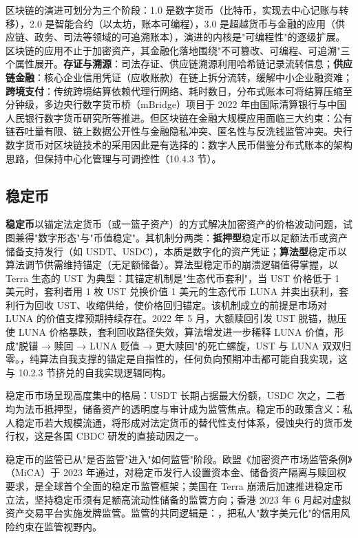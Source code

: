 区块链的演进可划分为三个阶段：1.0 是数字货币（比特币，实现去中心记账与转移），2.0 是智能合约（以太坊，账本可编程），3.0 是超越货币与金融的应用（供应链、政务、司法等领域的可追溯账本），演进的内核是"可编程性"的逐级扩展。区块链的应用不止于加密资产，其金融化落地围绕"不可篡改、可编程、可追溯"三个属性展开。\textbf{存证与溯源}：司法存证、供应链溯源利用哈希链记录流转信息；\textbf{供应链金融}：核心企业信用凭证（应收账款）在链上拆分流转，缓解中小企业融资难；\textbf{跨境支付}：传统跨境结算依赖代理行网络、耗时数日，分布式账本可将结算压缩至分钟级，多边央行数字货币桥（mBridge）项目于 2022 年由国际清算银行与中国人民银行数字货币研究所等推进。但区块链在金融大规模应用面临三大约束：公有链吞吐量有限、链上数据公开性与金融隐私冲突、匿名性与反洗钱监管冲突。央行数字货币对区块链技术的采用因此是有选择的：数字人民币借鉴分布式账本的架构思路，但保持中心化管理与可调控性（10.4.3 节）。

\subsection{稳定币}

\textbf{稳定币}以锚定法定货币（或一篮子资产）的方式解决加密资产的价格波动问题，试图兼得"数字形态"与"币值稳定"。其机制分两类：\textbf{抵押型}稳定币以足额法币或资产储备支持发行（如 USDT、USDC），本质是数字化的资产凭证；\textbf{算法型}稳定币以算法调节供需维持锚定（无足额储备）。算法型稳定币的崩溃逻辑值得掌握，以 Terra 生态的 UST 为典型：其锚定机制是"生态代币套利"，当 UST 价格低于 1 美元时，套利者用 1 枚 UST 兑换价值 1 美元的生态代币 LUNA 并卖出获利，套利行为回收 UST、收缩供给，使价格回归锚定。该机制成立的前提是市场对 LUNA 的价值支撑预期持续存在。2022 年 5 月，大额赎回引发 UST 脱锚，抛压使 LUNA 价格暴跌，套利回收路径失效，算法增发进一步稀释 LUNA 价值，形成"脱锚 → 赎回 → LUNA 贬值 → 更大赎回"的死亡螺旋，UST 与 LUNA 双双归零。，纯算法自我支撑的锚定是自指性的，任何负向预期冲击都可能自我实现，这与 10.2.3 节挤兑的自我实现逻辑同构。

稳定币市场呈现高度集中的格局：USDT 长期占据最大份额，USDC 次之，二者均为法币抵押型，储备资产的透明度与审计成为监管焦点。稳定币的政策含义：私人稳定币若大规模流通，将形成对法定货币的替代性支付体系，侵蚀央行的货币发行权，这是各国 CBDC 研发的直接动因之一。

稳定币的监管已从"是否监管"进入"如何监管"阶段。欧盟《加密资产市场监管条例》（MiCA）于 2023 年通过，对稳定币发行人设置资本金、储备资产隔离与赎回权要求，是全球首个全面的稳定币监管框架；美国在 Terra 崩溃后加速推进稳定币立法，坚持稳定币须有足额高流动性储备的监管方向；香港 2023 年 6 月起对虚拟资产交易平台实施发牌监管。监管的共同逻辑是：，把私人"数字美元化"的信用风险约束在监管视野内。


